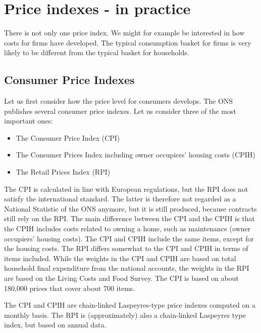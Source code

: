 \documentclass[
]{book}
\providecommand{\tightlist}{%
  \setlength{\itemsep}{0pt}\setlength{\parskip}{0pt}}
\begin{document}
\hypertarget{price-indexes---in-practice}{%
\section{Price indexes - in practice}\label{price-indexes---in-practice}}

There is not only one price index. We might for example be interested in how costs for firms have developed. The typical consumption basket for firms is very likely to be different from the typical basket for households.

\hypertarget{consumer-price-indexes}{%
\subsection*{Consumer Price Indexes}\label{consumer-price-indexes}}

Let us first consider how the price level for consumers develops. The ONS publishes several consumer price indexes. Let us consider three of the most important ones:

\begin{itemize}
\tightlist
\item
  The Consumer Price Index (CPI)
\item
  The Consumer Prices Index including owner occupiers' housing costs (CPIH)
\item
  The Retail Prices Index (RPI)
\end{itemize}

The CPI is calculated in line with European regulations, but the RPI does not satisfy the international standard. The latter is therefore not regarded as a National Statistic of the ONS anymore, but it is still produced, because contracts still rely on the RPI. The main difference between the CPI and the CPIH is that the CPIH includes costs related to owning a home, such as maintenance (owner occupiers' housing costs). The CPI and CPIH include the same items, except for the housing costs. The RPI differs somewhat to the CPI and CPIH in terms of items included. While the weights in the CPI and CPIH are based on total household final expenditure from the national accounts, the weights in the RPI are based on the Living Costs and Food Survey. The CPI is based on about 180,000 prices that cover about 700 items.

The CPI and CPIH are chain-linked Laspeyres-type price indexes computed on a monthly basis. The RPI is (approximately) also a chain-linked Laspeyres type index, but based on annual data.
\end{document}
